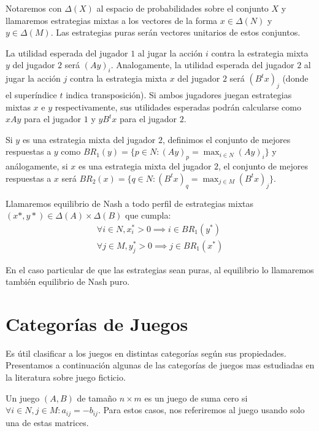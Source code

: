 Notaremos con $\Delta(X)$ al espacio de probabilidades sobre el conjunto $X$ y llamaremos estrategias mixtas a los vectores de la forma $x \in \Delta(N)$ y $y \in \Delta(M)$. Las estrategias puras serán vectores unitarios de estos conjuntos.

La utilidad esperada del jugador $1$ al jugar la acción $i$ contra la estrategia mixta $y$ del jugador $2$ será $(Ay)_i$. Analogamente, la utilidad esperada del jugador $2$ al jugar la acción $j$ contra la estrategia mixta $x$ del jugador $2$ será $(B^tx)_j$ (donde el superíndice $t$ indica transposición). Si ambos jugadores juegan estrategias mixtas $x$ e $y$ respectivamente, sus utilidades esperadas podrán calcularse como $xAy$ para el jugador $1$ y $yB^tx$ para el jugador $2$.

Si $y$ es una estrategia mixta del jugador $2$, definimos el conjunto de mejores respuestas a $y$ como $BR_1(y) = \{p \in N : (Ay)_p = \max_{i \in N} (Ay)_i\}$ y análogamente, si $x$ es una estrategia mixta del jugador $2$, el conjunto de mejores respuestas a $x$ será $BR_2(x) = \{q \in N : (B^tx)_q = \max_{j \in M} (B^tx)_j\}$.

Llamaremos equilibrio de Nash a todo perfil de estrategias mixtas $(x*, y*) \in \Delta(A) \times \Delta(B)$ que cumpla:
\begin{gather}
    \forall i \in N, x^*_i > 0 \implies i \in BR_1(y^*) \\
    \forall j \in M, y^*_j > 0 \implies j \in BR_1(x^*)
\end{gather}

En el caso particular de que las estrategias sean puras, al equilibrio lo llamaremos también equilibrio de Nash puro.

\section{Categorías de Juegos}

Es útil clasificar a los juegos en distintas categorías según sus propiedades. Presentamos a continuación algunas de las categorías de juegos mas estudiadas en la literatura sobre juego ficticio.

\begin{definition}
    Un juego $(A, B)$ de tamaño $n \times m$ es un juego de suma cero si $\forall i \in N, j \in M : a_{ij} = -b_{ij}$. Para estos casos, nos referiremos al juego usando solo una de estas matrices.
\end{definition}

